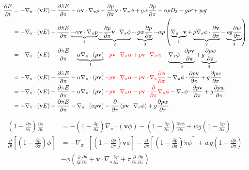 \documentclass[12pt]{article}
\numberwithin{equation}{section}
\newcommand{\pd}[2]{\frac{\partial #1}{\partial #2}}
\newcommand{\pdt}[1]{\pd{#1}{t}}
\renewcommand{\vec}[1]{\mathbf{#1}}
\newcommand{\grad}[2][\pi]{\nabla_{#1} #2}
\renewcommand{\div}[2][\pi]{\nabla_{#1} \cdot #2}
\begin{document}
\begin{align*}
  \pdt{E} & = - \div{\left(\vec{v} E\right)} - \pd{\dot{\pi} E}{\pi} - \alpha \vec{v} \cdot \grad{p} - \pd{p}{\pi} \vec{v} \cdot \grad{\phi} + g w \pd{p}{\pi} - \alpha p D_3 - \cancel{g w} + \cancel{w g} \\
  & = - \div{\left(\vec{v} E\right)} - \pd{\dot{\pi} E}{\pi} \underbrace{- \alpha \vec{v} \cdot \grad{p}}_1 \underbrace{- \pd{p}{\pi} \vec{v} \cdot \grad{\phi}}_2 + \underbrace{g w \pd{p}{\pi}}_3 - \alpha p \left(\underbrace{\div{\vec{v}}}_1 + \underbrace{\rho \grad{\phi} \cdot \pd{\vec{v}}{\pi}}_2 - \underbrace{\rho g \pd{w}{\pi}}_3\right) \\
  & = - \div{\left(\vec{v} E\right)} - \pd{\dot{\pi} E}{\pi} - \underbrace{\alpha \div{\left(p \vec{v}\right)}}_1 {\color{red}- p \vec{v} \cdot \grad{\alpha} + p \vec{v} \cdot \grad{\alpha}} - \underbrace{\grad{\phi} \cdot \pd{p \vec{v}}{\pi}}_2 + \underbrace{g \pd{p w}{\pi}}_3 \\
  & = - \div{\left(\vec{v} E\right)} - \pd{\dot{\pi} E}{\pi} - \alpha \div{\left(p \vec{v}\right)} {\color{red}- p \vec{v} \cdot \grad{\alpha} - p \vec{v} \cdot \grad{} \pd{\phi}{\pi}} - \grad{\phi} \cdot \pd{p \vec{v}}{\pi} + g \pd{p w}{\pi} \\
  & = - \div{\left(\vec{v} E\right)} - \pd{\dot{\pi} E}{\pi} - \alpha \div{\left(p \vec{v}\right)} {\color{red}- p \vec{v} \cdot \grad{\alpha} - p \vec{v} \cdot \pd{}{\pi} \grad{\phi}} - \grad{\phi} \cdot \pd{p \vec{v}}{\pi} + g \pd{p w}{\pi} \\
  & = - \div{\left(\vec{v} E\right)} - \pd{\dot{\pi} E}{\pi} - \div{\left(\alpha p \vec{v}\right)} - \pd{}{\pi} \left(p \vec{v} \cdot \grad{\phi}\right) + g \pd{p w}{\pi}
\end{align*}

\begin{align*}
  \left(1 - \pd{p}{\pi}\right) \pdt{\phi} & = - \left(1 - \pd{p}{\pi}\right) \div{\left(\vec{v} \phi\right)} - \left(1 - \pd{p}{\pi}\right) \pd{\dot{\pi} \phi}{\pi} + w g \left(1 - \pd{p}{\pi}\right) \\
  \pdt{} \left[\left(1 - \pd{p}{\pi}\right) \phi\right] & = - \div{\left[\left(1 - \pd{p}{\pi}\right) \vec{v} \phi\right]} - \pd{}{\pi} \left[\left(1 - \pd{p}{\pi}\right) \dot{\pi} \phi\right] + w g \left(1 - \pd{p}{\pi}\right) \\
  & - \phi \left(\pdt{} \pd{p}{\pi} + \vec{v} \cdot \grad{\pd{p}{\pi}} + \dot{\pi} \pd{}{\pi} \pd{p}{\pi}\right)
\end{align*}
\end{document}
